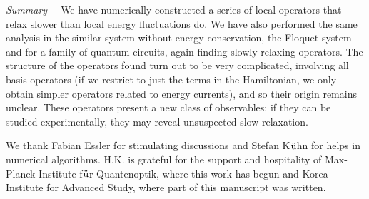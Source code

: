 \documentclass[twocolumn,superscriptaddress, prb]{revtex4-1}
\begin{document}
{\it Summary---}
We have numerically constructed a series of local operators that relax slower than local energy fluctuations do.
We have also performed the same analysis in the similar system without energy conservation,
the Floquet system and for a family of quantum circuits, again finding slowly relaxing operators.
The structure of the operators found turn out to be very complicated, involving all basis operators
(if we restrict to just the terms in the Hamiltonian, we only obtain simpler operators related to energy currents),
and so their origin remains unclear.
These operators present a new class of observables; if they can be studied experimentally, they may reveal unsuspected slow relaxation.


We thank Fabian Essler for stimulating discussions and Stefan K${\rm{\ddot u}}$hn for helps in numerical algorithms.
H.K. is grateful for the support and hospitality of Max-Planck-Institute f${\rm{\ddot u}}$r Quantenoptik,
where this work has begun and Korea Institute for Advanced Study, where part of this manuscript was written.



\end{document}
